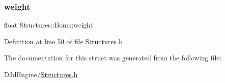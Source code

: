 \subsubsection{\texorpdfstring{weight}{weight}}
{\footnotesize\ttfamily float Structures\+::\+Bone\+::weight}



Definition at line 50 of file Structures.\+h.



The documentation for this struct was generated from the following file\+:\begin{DoxyCompactItemize}
\item 
D3d\+Engine/\mbox{\hyperlink{_structures_8h}{Structures.\+h}}\end{DoxyCompactItemize}
